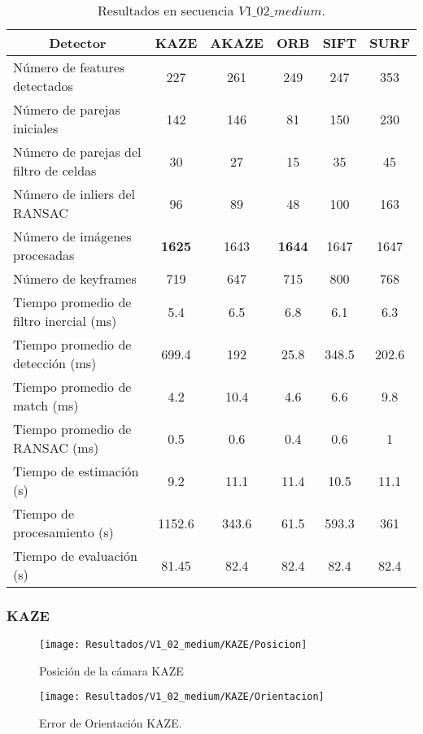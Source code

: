 \begin{table}[htbp]
	\caption{Resultados  en secuencia $V1\_02\_medium$.}
	\begin{tabular}{|l|c|c|c|c|c|}
		\hline
		\multicolumn{1}{|c|}{\textbf{Detector}} & \textbf{KAZE} & \textbf{AKAZE} & \textbf{ORB} & \textbf{SIFT} & \textbf{SURF} \\ \hline
		Número de features detectados & 227 & 261 & 249 & 247 & 353 \\ \hline
		Número de parejas iniciales & 142 & 146 & 81 & 150 & 230 \\ \hline
		Número de parejas del filtro de celdas & 30 & 27 & 15 & 35 & 45 \\ \hline
		Número de inliers del RANSAC & 96 & 89 & 48 & 100 & 163 \\ \hline
		Número de imágenes procesadas & \textbf{1625} & 1643 & \textbf{1644} & 1647 & 1647 \\ \hline
		Número de keyframes & 719 & 647 & 715 & 800 & 768 \\ \hline
		Tiempo promedio de filtro inercial (ms) & 5.4 & 6.5 & 6.8 & 6.1 & 6.3 \\ \hline
		Tiempo promedio de detección  (ms) & 699.4 & 192 & 25.8 & 348.5 & 202.6 \\ \hline
		Tiempo promedio de match (ms) & 4.2 & 10.4 & 4.6 & 6.6 & 9.8 \\ \hline
		Tiempo promedio de RANSAC (ms) & 0.5 & 0.6 & 0.4 & 0.6 & 1 \\ \hline
		Tiempo de estimación (s) & 9.2 & 11.1 & 11.4 & 10.5 & 11.1 \\ \hline
		Tiempo de  procesamiento (s) & 1152.6 & 343.6 & 61.5 & 593.3 & 361 \\ \hline
		Tiempo de evaluación (s) & 81.45 & 82.4 & 82.4 & 82.4 & 82.4 \\ \hline
	\end{tabular}
	\label{Tabla/Resultados/V1_02_medium}
\end{table}

\subsubsection{KAZE}


\begin{figure}[H]
	\centering
	\texttt{[image: Resultados/V1\_02\_medium/KAZE/Posicion]}
	\caption{Posición de la cámara KAZE}
	\label{imagen:Resultados/V1_02_medium/KAZE/Posicion}
\end{figure}


\begin{figure}[H]
	\centering
	\texttt{[image: Resultados/V1\_02\_medium/KAZE/Orientacion]}
	\caption[Error de Orientación KAZE]{Error de Orientación KAZE.}
	\label{imagen:Resultados/V1_02_medium/KAZE/Orientacion}
\end{figure}



